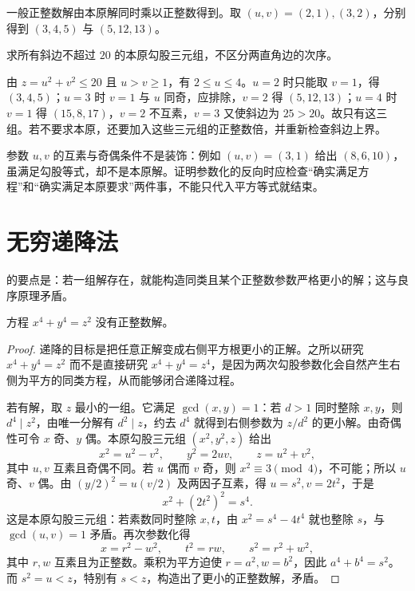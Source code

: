 \documentclass[UTF8,12pt,a4paper,fontset=fandol]{ctexbook}
\begin{document}
一般正整数解由本原解同时乘以正整数得到。取 $(u,v)=(2,1),(3,2)$，分别得到 $(3,4,5)$ 与 $(5,12,13)$。

\begin{example}[参数条件怎样保证不漏解]
求所有斜边不超过 $20$ 的本原勾股三元组，不区分两直角边的次序。
\end{example}
\begin{solve}
由 $z=u^2+v^2\le20$ 且 $u>v\ge1$，有 $2\le u\le4$。$u=2$ 时只能取 $v=1$，得 $(3,4,5)$；$u=3$ 时 $v=1$ 与 $u$ 同奇，应排除，$v=2$ 得 $(5,12,13)$；$u=4$ 时 $v=1$ 得 $(15,8,17)$，$v=2$ 不互素，$v=3$ 又使斜边为 $25>20$。故只有这三组。若不要求本原，还要加入这些三元组的正整数倍，并重新检查斜边上界。
\end{solve}

参数 $u,v$ 的互素与奇偶条件不是装饰：例如 $(u,v)=(3,1)$ 给出 $(8,6,10)$，虽满足勾股等式，却不是本原解。证明参数化的反向时应检查“确实满足方程”和“确实满足本原要求”两件事，不能只代入平方等式就结束。

\section{无穷递降法}

的要点是：若一组解存在，就能构造同类且某个正整数参数严格更小的解；这与良序原理矛盾。

\begin{theorem}
\label{thm:fermat-four}
方程 $x^4+y^4=z^2$ 没有正整数解。
\end{theorem}
\begin{proof}
递降的目标是把任意正解变成右侧平方根更小的正解。之所以研究 $x^4+y^4=z^2$ 而不是直接研究 $x^4+y^4=z^4$，是因为两次勾股参数化会自然产生右侧为平方的同类方程，从而能够闭合递降过程。

若有解，取 $z$ 最小的一组。它满足 $\gcd(x,y)=1$：若 $d>1$ 同时整除 $x,y$，则 $d^4\mid z^2$，由唯一分解有 $d^2\mid z$，约去 $d^4$ 就得到右侧参数为 $z/d^2$ 的更小解。由奇偶性可令 $x$ 奇、$y$ 偶。本原勾股三元组 $(x^2,y^2,z)$ 给出
\[
 x^2=u^2-v^2,\qquad y^2=2uv,\qquad z=u^2+v^2,
\]
其中 $u,v$ 互素且奇偶不同。若 $u$ 偶而 $v$ 奇，则 $x^2\equiv3\pmod4$，不可能；所以 $u$ 奇、$v$ 偶。由 $(y/2)^2=u(v/2)$ 及两因子互素，得 $u=s^2,v=2t^2$，于是
\[
 x^2+(2t^2)^2=s^4.
\]
这是本原勾股三元组：若素数同时整除 $x,t$，由 $x^2=s^4-4t^4$ 就也整除 $s$，与 $\gcd(u,v)=1$ 矛盾。再次参数化得
\[
 x=r^2-w^2,\qquad t^2=rw,\qquad s^2=r^2+w^2,
\]
其中 $r,w$ 互素且为正整数。乘积为平方迫使 $r=a^2,w=b^2$，因此 $a^4+b^4=s^2$。而 $s^2=u<z$，特别有 $s<z$，构造出了更小的正整数解，矛盾。
\end{proof}
\end{document}
